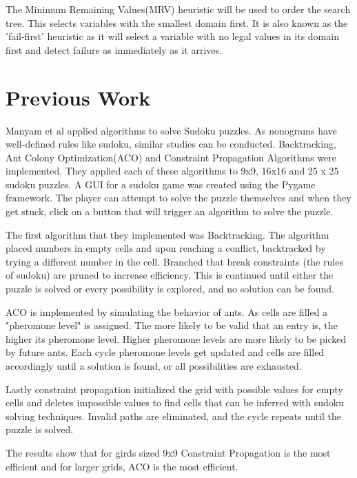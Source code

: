 \documentclass[12pt, letterpaper]
{article}
\begin{document}
    The Minimum Remaining Values(MRV) heuristic will be used to order the search tree. This selects variables with the smallest domain first. It is also known as the 'fail-first' heuristic as it will select a variable with no legal values in its domain first and detect failure as immediately as it arrives. \cite{russell_artificial_2022}






\section{Previous Work}
    Manyam et al \cite{10863160} applied algorithms to solve Sudoku puzzles. As nonograms have well-defined rules like sudoku, similar studies can be conducted. Backtracking, Ant Colony Optimization(ACO) and Constraint Propagation Algorithms were implemented. They applied each of these algorithms to 9x9, 16x16 and 25 x 25 sudoku puzzles. A GUI for a sudoku game was created using the Pygame framework. The player can attempt to solve the puzzle themselves and when they get stuck, click on a button that will trigger an algorithm to solve the puzzle.

    The first algorithm that they implemented was Backtracking. The algorithm placed numbers in empty cells and upon reaching a conflict, backtracked by trying a different number in the cell. Branched that break constraints (the rules of sudoku) are pruned to increase efficiency. This is continued until either the puzzle is solved or every possibility is explored, and no solution can be found.

    ACO is implemented by simulating the behavior of ants. As cells are filled a "pheromone level" is assigned. The more likely to be valid that an entry is, the higher its pheromone level. Higher pheromone levels are more likely to be picked by future ants. Each cycle pheromone levels get updated and cells are filled accordingly until a solution is found, or all possibilities are exhausted.

    Lastly constraint propagation initialized the grid with possible values for empty cells and deletes impossible values to find cells that can be inferred with sudoku solving techniques. Invalid paths are eliminated, and the cycle repeats until the puzzle is solved.

    The results show that for girds sized 9x9 Constraint Propagation is the most efficient and for larger grids, ACO is the most efficient.
\end{document}
